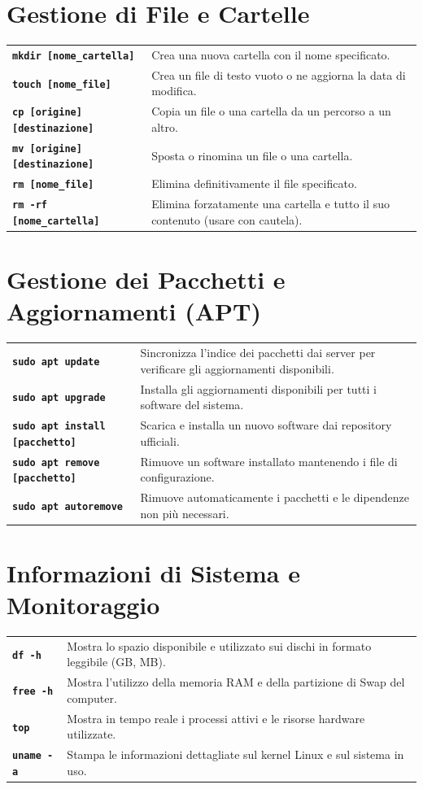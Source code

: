 \documentclass[10pt,a4paper]{article}
\begin{document}
\section*{Gestione di File e Cartelle}
\noindent
\begin{tabular}{@{}p{5cm}p{12cm}@{}}
\textbf{\texttt{mkdir [nome\_cartella]}} & Crea una nuova cartella con il nome specificato. \\
\textbf{\texttt{touch [nome\_file]}} & Crea un file di testo vuoto o ne aggiorna la data di modifica. \\
\textbf{\texttt{cp [origine] [destinazione]}} & Copia un file o una cartella da un percorso a un altro. \\
\textbf{\texttt{mv [origine] [destinazione]}} & Sposta o rinomina un file o una cartella. \\
\textbf{\texttt{rm [nome\_file]}} & Elimina definitivamente il file specificato. \\
\textbf{\texttt{rm -rf [nome\_cartella]}} & Elimina forzatamente una cartella e tutto il suo contenuto (usare con cautela).
\end{tabular}

\section*{Gestione dei Pacchetti e Aggiornamenti (APT)}
\noindent
\begin{tabular}{@{}p{5cm}p{12cm}@{}}
\textbf{\texttt{sudo apt update}} & Sincronizza l'indice dei pacchetti dai server per verificare gli aggiornamenti disponibili. \\
\textbf{\texttt{sudo apt upgrade}} & Installa gli aggiornamenti disponibili per tutti i software del sistema. \\
\textbf{\texttt{sudo apt install [pacchetto]}} & Scarica e installa un nuovo software dai repository ufficiali. \\
\textbf{\texttt{sudo apt remove [pacchetto]}} & Rimuove un software installato mantenendo i file di configurazione. \\
\textbf{\texttt{sudo apt autoremove}} & Rimuove automaticamente i pacchetti e le dipendenze non più necessari.
\end{tabular}

\section*{Informazioni di Sistema e Monitoraggio}
\noindent
\begin{tabular}{@{}p{5cm}p{12cm}@{}}
\textbf{\texttt{df -h}} & Mostra lo spazio disponibile e utilizzato sui dischi in formato leggibile (GB, MB). \\
\textbf{\texttt{free -h}} & Mostra l'utilizzo della memoria RAM e della partizione di Swap del computer. \\
\textbf{\texttt{top}} & Mostra in tempo reale i processi attivi e le risorse hardware utilizzate. \\
\textbf{\texttt{uname -a}} & Stampa le informazioni dettagliate sul kernel Linux e sul sistema in uso.
\end{tabular}
\end{document}
